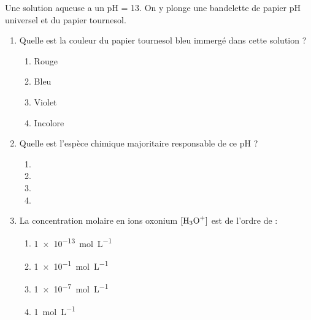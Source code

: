 \documentclass[11pt]{article}
\begin{document}
\begin{exercice}
\label{exo:qcm}
Une solution aqueuse a un pH = 13. On y plonge une bandelette de papier pH universel et du papier tournesol.
\begin{enumerate}
    \item Quelle est la couleur du papier tournesol bleu immergé dans cette solution ?
    \begin{enumerate}
        \item Rouge \item Bleu \item Violet \item Incolore
    \end{enumerate}
    \item Quelle est l'espèce chimique majoritaire responsable de ce pH ?
    \begin{enumerate}
        \item {} \item {} \item {} \item {}
    \end{enumerate}
    \item La concentration molaire en ions oxonium $[\ce{H3O+}]$ est de l'ordre de :
    \begin{enumerate}
        \item \SI{1e-13}{mol.L^{-1}} \item \SI{1e-1}{mol.L^{-1}} \item \SI{1e-7}{mol.L^{-1}} \item \SI{1}{mol.L^{-1}}
    \end{enumerate}
\end{enumerate}
\end{exercice}
\end{document}
